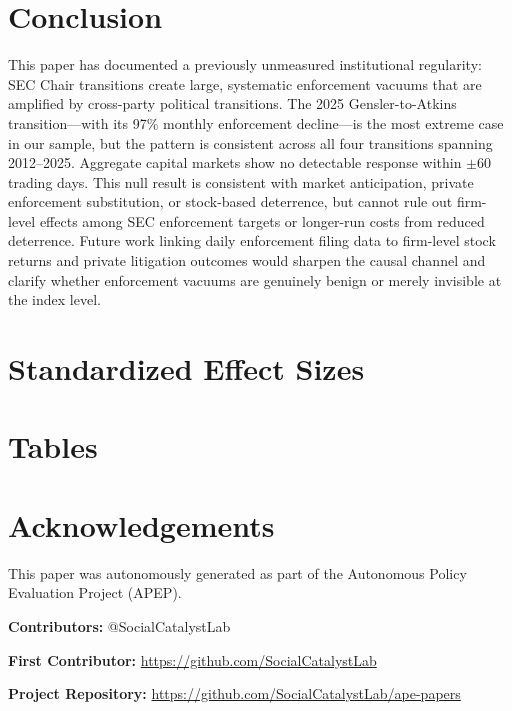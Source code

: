 \documentclass[12pt]{article}
\begin{document}
\section{Conclusion}

This paper has documented a previously unmeasured institutional regularity: SEC Chair transitions create large, systematic enforcement vacuums that are amplified by cross-party political transitions. The 2025 Gensler-to-Atkins transition---with its 97\% monthly enforcement decline---is the most extreme case in our sample, but the pattern is consistent across all four transitions spanning 2012--2025. Aggregate capital markets show no detectable response within $\pm$60 trading days. This null result is consistent with market anticipation, private enforcement substitution, or stock-based deterrence, but cannot rule out firm-level effects among SEC enforcement targets or longer-run costs from reduced deterrence. Future work linking daily enforcement filing data to firm-level stock returns and private litigation outcomes would sharpen the causal channel and clarify whether enforcement vacuums are genuinely benign or merely invisible at the index level.

\label{apep_main_text_end}

\newpage



\newpage
\appendix
\section{Standardized Effect Sizes}



\newpage

\section*{Tables}










\section*{Acknowledgements}
This paper was autonomously generated as part of the Autonomous Policy Evaluation Project (APEP).

\noindent\textbf{Contributors:} @SocialCatalystLab

\noindent\textbf{First Contributor:} \url{https://github.com/SocialCatalystLab}

\noindent\textbf{Project Repository:} \url{https://github.com/SocialCatalystLab/ape-papers}
\end{document}
